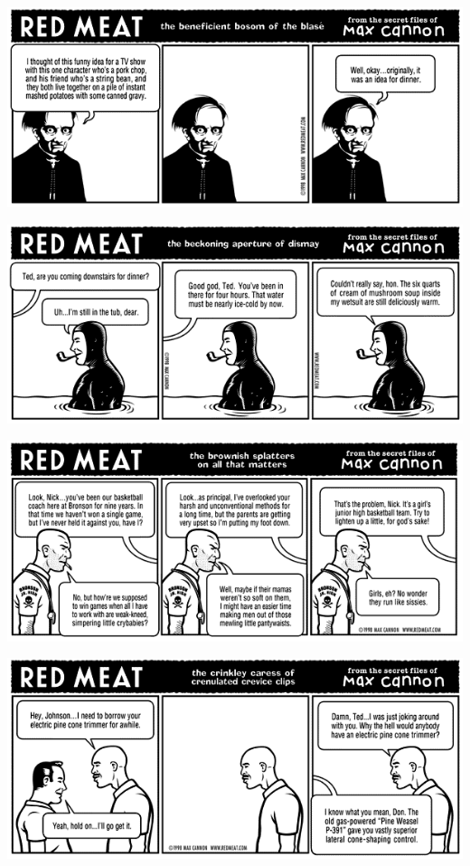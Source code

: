 \documentclass[a4paper,twoside,11pt]{article}
\begin{document}
\includegraphics[width=\textwidth]{redmeat_1998-12-21.png}



\includegraphics[width=\textwidth]{redmeat_1998-12-28.png}



\includegraphics[width=\textwidth]{redmeat_1999-01-04.png}



\includegraphics[width=\textwidth]{redmeat_1999-01-11.png}
\end{document}
